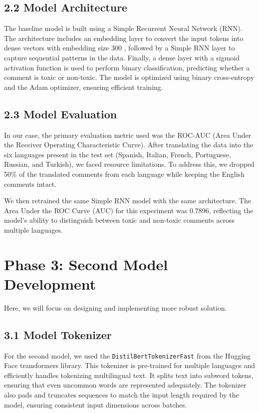\documentclass{article}
\begin{document}
\subsection*{2.2 Model Architecture}
The baseline model is built using a Simple Recurrent Neural Network (RNN). The architecture includes an embedding layer to convert the input tokens into dense vectors with embedding size 300 , followed by a Simple RNN layer to capture sequential patterns in the data. Finally, a dense layer with a sigmoid activation function is used to perform binary classification, predicting whether a comment is toxic or non-toxic. The model is optimized using binary cross-entropy and the Adam optimizer, ensuring efficient training.

\subsection*{2.3 Model Evaluation}
In our case, the primary evaluation metric used was the ROC-AUC (Area Under the Receiver Operating Characteristic Curve). After translating the data into the six languages present in the test set (Spanish, Italian, French, Portuguese, Russian, and Turkish), we faced resource limitations. To address this, we dropped 50\% of the translated comments from each language while keeping the English comments intact. 

We then retrained the same Simple RNN model with the same architecture. The Area Under the ROC Curve (AUC) for this experiment was 0.7896, reflecting the model's ability to distinguish between toxic and non-toxic comments across multiple languages.



\section*{Phase 3: Second Model Development}
Here, we will focus on designing and implementing more robust solution.

\subsection*{3.1 Model Tokenizer}
For the second model, we used the \texttt{DistilBertTokenizerFast} from the Hugging Face transformers library. This tokenizer is pre-trained for multiple languages and efficiently handles tokenizing multilingual text. It splits text into subword tokens, ensuring that even uncommon words are represented adequately. The tokenizer also pads and truncates sequences to match the input length required by the model, ensuring consistent input dimensions across batches.
\end{document}
